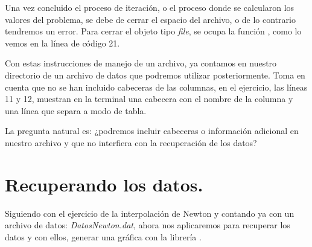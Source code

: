 \par
Una vez concluido el proceso de iteración, o el proceso donde se calcularon los valores del problema, se debe de cerrar el espacio del archivo, o de lo contrario tendremos un error. Para cerrar el objeto tipo \emph{file}, se ocupa la función , como lo vemos en la línea de código 21.
\par
Con estas instrucciones de manejo de un archivo, ya contamos en nuestro directorio de un archivo de datos que podremos utilizar posteriormente. Toma en cuenta que no se han incluido cabeceras de las columnas, en el ejercicio, las líneas 11 y 12, muestran en la terminal una cabecera con el nombre de la columna y una línea que separa a modo de tabla.
\par
La pregunta natural es: ¿podremos incluir cabeceras o información adicional en nuestro archivo y que no interfiera con la recuperación de los datos?
\section{Recuperando los datos.}
Siguiendo con el ejercicio de la interpolación de Newton y contando ya con un archivo de datos: \emph{DatosNewton.dat}, ahora nos aplicaremos para recuperar los datos y con ellos, generar una gráfica con la librería .
